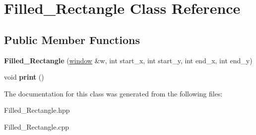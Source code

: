 \hypertarget{class_filled___rectangle}{}\section{Filled\+\_\+\+Rectangle Class Reference}
\label{class_filled___rectangle}
\subsection*{Public Member Functions}
\begin{DoxyCompactItemize}
\item 
{\bfseries Filled\+\_\+\+Rectangle} (\hyperlink{classwindow}{window} \&w, int start\+\_\+x, int start\+\_\+y, int end\+\_\+x, int end\+\_\+y)\hypertarget{class_filled___rectangle_a9172bc1db5e2bc07f3f97fd504a77117}{}\label{class_filled___rectangle_a9172bc1db5e2bc07f3f97fd504a77117}

\item 
void {\bfseries print} ()\hypertarget{class_filled___rectangle_a1d1b68daef35ffce65a4e549acc59872}{}\label{class_filled___rectangle_a1d1b68daef35ffce65a4e549acc59872}

\end{DoxyCompactItemize}


The documentation for this class was generated from the following files\+:\begin{DoxyCompactItemize}
\item 
Filled\+\_\+\+Rectangle.\+hpp\item 
Filled\+\_\+\+Rectangle.\+cpp\end{DoxyCompactItemize}
